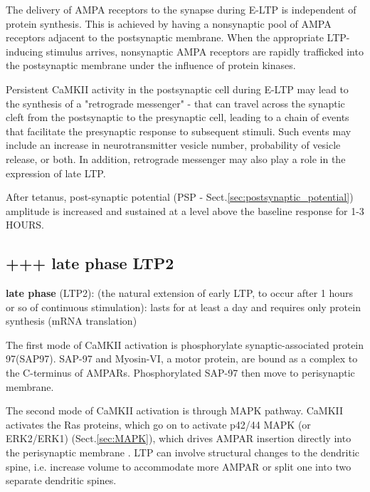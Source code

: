   The delivery of AMPA receptors to the synapse during E-LTP is independent of
  protein synthesis. This is achieved by having a nonsynaptic pool of AMPA
  receptors adjacent to the postsynaptic membrane.
  When the appropriate LTP-inducing stimulus arrives, nonsynaptic AMPA receptors
  are rapidly trafficked into the postsynaptic membrane under the influence of
  protein kinases.

  Persistent CaMKII activity in the postsynaptic cell during E-LTP may lead to
  the synthesis of a "retrograde messenger" - that can  travel across the
  synaptic cleft from the postsynaptic to the
   presynaptic cell, leading to a chain of events that facilitate the
   presynaptic response to subsequent stimuli. Such events may include an
   increase in neurotransmitter vesicle number, probability of vesicle release,
   or both. In addition, retrograde messenger may also play a role in the
   expression of late LTP.

After tetanus, post-synaptic potential (PSP -
Sect.\ref{sec:postsynaptic_potential}) amplitude is increased and sustained at a
level above the baseline response for 1-3 HOURS.

\subsection{+++ late phase LTP2}

{\bf late phase } (LTP2): (the natural extension of early LTP, to occur
  after 1 hours or so of continuous stimulation):   lasts for at least a day and
  requires only protein synthesis (mRNA translation)
  
  
  The first mode of CaMKII activation is phosphorylate synaptic-associated
  protein 97(SAP97).
  SAP-97 and Myosin-VI, a motor protein, are bound as a complex to the
  C-terminus of AMPARs. Phosphorylated SAP-97 then move to perisynaptic
  membrane.
  
  The second mode of CaMKII activation is through MAPK pathway.
  CaMKII activates the Ras proteins, which go on to activate p42/44 MAPK (or
  ERK2/ERK1) (Sect.\ref{sec:MAPK}), which drives AMPAR insertion directly into
  the perisynaptic membrane \citep{zhu2002}.
  LTP can involve structural changes to the dendritic spine, i.e. increase
  volume to accommodate more AMPAR or split one into two separate dendritic
  spines.
    
